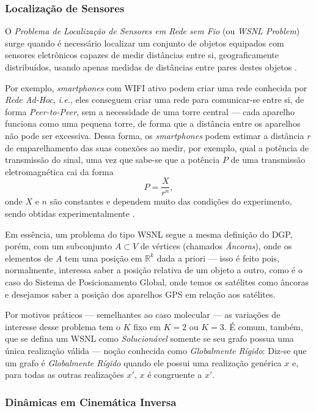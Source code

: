 \subsubsection{Localização de Sensores}

O \textit{Problema de Localização de Sensores em Rede sem Fio} (ou \textit{WSNL Problem}) surge quando é necessário localizar um conjunto de objetos equipados com sensores eletrônicos capazes de medir distâncias entre si, geograficamente distribuídos, usando apenas medidas de distâncias entre pares destes objetos \cite{yemini1978positioning}. 

Por exemplo, \textit{smartphones} com WIFI ativo podem criar uma rede conhecida por \textit{Rede Ad-Hoc}, \textit{i.e.}, eles conseguem criar uma rede para comunicar-se entre si, de forma \textit{Peer-to-Peer}, sem a necessidade de uma torre central --- cada aparelho funciona como uma pequena torre, de forma que a distância entre os aparelhos não pode ser excessiva.
Dessa forma, os \textit{smartphones} podem estimar a distância $r$ de emparelhamento das suas conexões ao medir, por exemplo, qual a potência de transmissão do sinal, uma vez que sabe-se que a potência $P$ de uma transmissão eletromagnética cai da forma 
\begin{equation}
	P = \frac{X}{r^n},
\end{equation}
onde $X$ e $n$ são constantes e dependem muito das condições do experimento, sendo obtidas experimentalmente \cite{savvides2001dynamic}.

Em essência, um problema do tipo WSNL segue a mesma definição do DGP, porém, com um subconjunto $A\subset V$ de vértices (chamados \textit{Âncoras}), onde os elementos de $A$ tem uma posição em $\mathbb{R}^k$ dada a priori --- isso é feito pois, normalmente, interessa saber a posição relativa de um objeto a outro, como é o caso do Sistema de Posicionamento Global, onde temos os satélites como âncoras e desejamos saber a posição dos aparelhos GPS em relação aos satélites.

Por motivos práticos --- semelhantes ao caso molecular --- as variações de interesse desse problema tem o $K$ fixo em $K= 2$ ou $K=3$. É comum, também, que se defina um WSNL como \textit{Solucionável} somente se seu grafo possua uma única realização válida --- noção conhecida como \textit{Globalmente Rígido}: Diz-se que um grafo é \textit{Globalmente Rígido} quando ele possui uma realização genérica $x$ e, para todas as outras realizações $x'$, $x$ é congruente a $x'$. 

\subsubsection{Dinâmicas em Cinemática Inversa}

